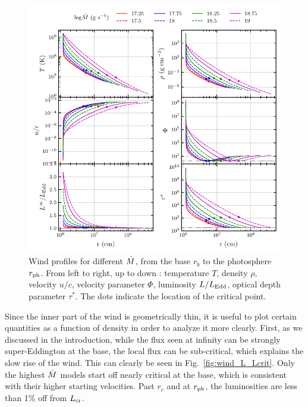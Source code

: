 \documentclass[../main.tex]{subfiles}
\begin{document}
\begin{figure}[htb!]
    \centering
    \includegraphics[width=\textwidth]{figures/wind_profiles.pdf}
    \caption[Wind radial profiles]{Wind profiles for different $\dot{M}$, from the base $r_b$ to the photosphere $r_\text{ph}$. From left to right, up to down : temperature $T$, density $\rho$, velocity $u/c$, velocity parameter $\Phi$, luminosity $L/L_\text{Edd}$, optical depth parameter $\tau^*$. The dots indicate the location of the critical point.}
    \label{fig:wind_profiles}
\end{figure}

Since the inner part of the wind is geometrically thin, it is useful to plot certain quantities as a function of density in order to analyze it more clearly. First, as we discussed in the introduction, while the flux seen at infinity can be strongly super-Eddington at the base, the local flux can be sub-critical, which explains the slow rise of the wind. This can clearly be seen in Fig.~\ref{fig:wind_L_Lcrit}. Only the highest $\dot{M}$ models start off nearly critical at the base, which is consistent with their higher starting velocities. Past $r_c$ and at $r_\text{ph}$, the luminosities are less than 1\% off from $L_\text{cr}$.
\end{document}
